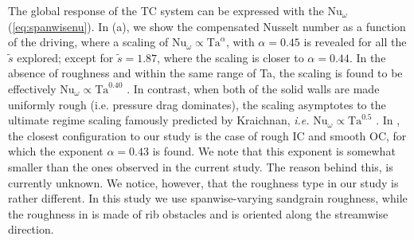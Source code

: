 The global response of the TC system can be expressed with the $\text{Nu}_\omega$ (\ref{eq:spanwisenu}). In (a), we show the compensated Nusselt number as a function of the driving, where a scaling of $\text{Nu}_\omega\propto \text{Ta}^\alpha$, with $\alpha=0.45$ is revealed for all the $\tilde{s}$ explored; except for $\tilde{s}=1.87$, where the scaling is closer to $\alpha=0.44$. In the absence of roughness and within the same range of Ta, the scaling is found to be effectively $\text{Nu}_\omega\propto \text{Ta}^{0.40}$ \citep{Paoletti2011,vanGils2011,Huisman2014}.
In contrast, when both of the solid walls are made uniformly rough (i.e. pressure drag dominates), the scaling asymptotes to the ultimate regime scaling famously predicted by Kraichnan, \textit{i.e.} $\text{Nu}_\omega\propto \text{Ta}^{0.5}$ \citep{Kraichnan1962,Zhu2018}. In  \cite{Zhu2018}, the closest configuration to our study is the case of rough IC and smooth OC, for which the exponent $\alpha=0.43$ is found. We note that this exponent is somewhat smaller than the ones observed in the current study. The reason behind this, is currently unknown. We notice, however, that the roughness type in our study is rather different. In this study we use spanwise-varying sandgrain roughness, while the roughness in \citet{Zhu2018} is made of rib obstacles and is oriented along the streamwise direction. 

